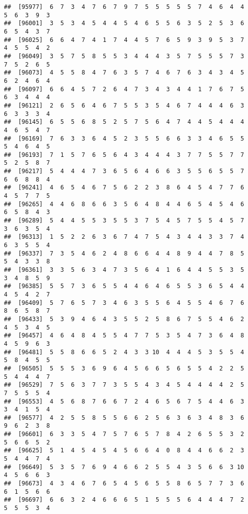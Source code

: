 \documentclass[
]{book}
\begin{document}
\begin{verbatim}
##  [95977]  6  7  3  4  7  6  7  9  7  5  5  5  5  5  7  4  6  4  4  5  6  3  9  3
##  [96001]  3  5  3  4  5  4  4  5  4  6  5  5  6  3  5  2  5  3  6  6  5  4  3  7
##  [96025]  6  6  4  7  4  1  7  4  4  5  7  6  5  9  3  9  5  3  7  4  5  5  4  2
##  [96049]  3  5  7  5  8  5  5  3  4  4  4  3  5  7  5  5  5  7  3  7  5  2  6  5
##  [96073]  4  5  5  8  4  7  6  3  5  7  4  6  7  6  3  4  3  4  5  6  2  4  6  4
##  [96097]  6  6  4  5  7  2  6  4  7  3  4  3  4  4  1  7  6  7  5  6  3  4  4  4
##  [96121]  2  6  5  6  4  6  7  5  5  3  5  4  6  7  4  4  4  6  3  6  3  3  3  4
##  [96145]  6  5  5  6  8  5  2  5  7  5  6  4  7  4  4  5  4  4  4  4  6  5  4  7
##  [96169]  7  6  3  3  6  4  5  2  3  5  5  6  6  3  3  4  6  5  5  5  4  6  4  5
##  [96193]  7  1  5  7  6  5  6  4  3  4  4  4  3  7  7  5  5  7  7  5  2  5  8  7
##  [96217]  5  4  4  4  7  3  6  5  6  4  6  6  3  5  5  6  5  5  7  6  6  8  8  4
##  [96241]  4  6  5  4  6  7  5  6  2  2  3  8  6  4  5  4  7  7  6  4  5  7  7  5
##  [96265]  4  4  6  8  6  6  3  5  6  4  8  4  4  6  5  4  5  4  6  6  5  8  4  3
##  [96289]  5  4  4  5  5  3  5  5  3  7  5  4  5  7  5  5  4  5  7  3  6  3  5  4
##  [96313]  1  5  2  2  6  3  6  7  4  7  5  4  3  4  4  3  3  7  4  6  3  5  5  4
##  [96337]  7  3  5  4  6  2  4  8  6  6  4  4  8  9  4  4  7  8  5  5  4  3  3  8
##  [96361]  3  3  5  6  3  4  7  3  5  6  4  1  6  4  4  5  5  3  5  3  4  8  5  9
##  [96385]  5  5  7  3  6  5  5  4  4  6  4  6  5  5  3  6  5  4  4  4  5  4  2  7
##  [96409]  5  7  6  5  7  3  4  6  3  5  5  6  4  5  5  4  6  7  6  8  6  5  8  7
##  [96433]  5  3  9  4  6  4  3  5  5  2  5  8  6  7  5  5  4  6  2  4  5  3  4  5
##  [96457]  4  6  4  8  4  5  5  4  7  7  5  3  5  4  7  3  6  4  8  4  5  9  6  3
##  [96481]  5  5  8  6  6  5  2  4  3  3 10  4  4  4  5  3  5  5  4  5  8  4  5  5
##  [96505]  5  5  5  3  6  9  6  4  5  6  6  5  6  5  5  4  2  2  5  5  4  4  4  7
##  [96529]  7  5  6  3  7  7  3  5  5  4  3  4  5  4  4  4  4  2  5  7  5  5  5  4
##  [96553]  4  5  6  8  7  6  6  7  2  4  6  5  6  7  5  4  4  6  3  3  4  1  5  4
##  [96577]  4  2  5  5  8  5  5  6  6  2  5  6  3  6  3  4  8  3  6  9  6  2  3  8
##  [96601]  6  3  3  5  4  7  5  7  6  5  7  8  4  2  6  5  5  3  2  5  6  6  5  2
##  [96625]  5  1  4  5  4  5  4  5  6  6  4  0  8  4  4  6  6  2  3  5  4  4  7  4
##  [96649]  5  3  5  7  6  9  4  6  6  2  5  5  4  3  5  6  6  3 10  4  5  6  6  3
##  [96673]  4  3  4  6  7  6  5  4  5  6  5  5  8  6  5  7  7  3  6  6  1  5  6  6
##  [96697]  6  6  3  2  4  6  6  6  5  1  5  5  5  6  4  4  4  7  2  5  5  5  3  4

\end{verbatim}
\end{document}
